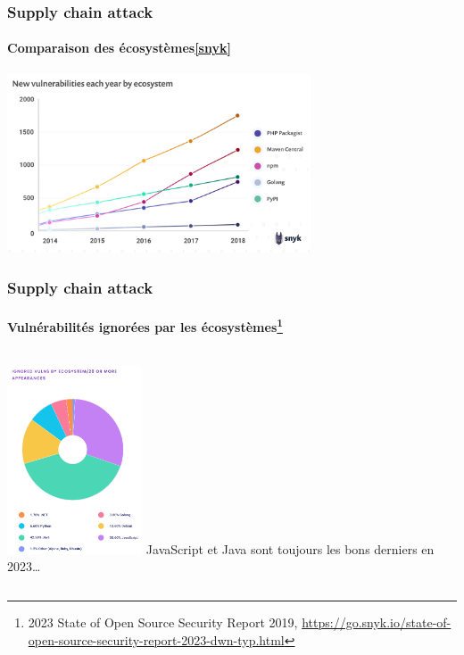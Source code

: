 \documentclass{beamer}
\begin{document}
    \begin{frame}
        \frametitle{Supply chain attack}
        \framesubtitle{Comparaison des écosystèmes\cref{snyk}}
        \transdissolve
        \centering
        \includegraphics[width=9cm]{image/vuln-created}
    \end{frame}

    \begin{frame}
        \frametitle{Supply chain attack}
        \framesubtitle{Vulnérabilités ignorées par les écosystèmes\footnote{\label{snyk2023}2023 State of Open Source Security Report 2019, \url{https://go.snyk.io/state-of-open-source-security-report-2023-dwn-typ.html}}}
        \transdissolve
        \centering
        \begin{columns}
            \includegraphics[width=4cm]{image/vuln-by-ecosystem}
            JavaScript et Java sont toujours les bons derniers en 2023\ldots
        \end{columns}
    \end{frame}
\end{document}
